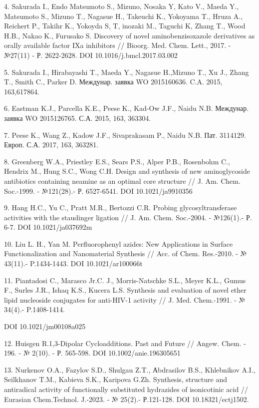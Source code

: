 4. Sakurada I., Endo Matsumoto S., Mizuno, Nosaka Y, Kato V., Maeda Y.,
Matsumoto S., Mizuno T., Nagasue H., Takeuchi K., Yokoyama T., Hruza A.,
Reichert P., Takihr K., Yokoyda S, T, inozaki M., Taguchi K, Zhang T.,
Wood H.B., Nakao K., Furusako S. Discovery of novel aminobenzisoxazole
derivatives as orally available factor IXa inhibitors // Bioorg. Med.
Chem. Lett., 2017. - №27(11) - Р. 2622-2628. DOI
10.1016/j.bmcl.2017.03.002

5. Sakurada I., Hirabayashi T., Maeda Y., Nagasue H.,Mizuno T., Xu J.,
Zhang T., Smith C., Parker D. Междунар. заявка WO 2015160636. C.A. 2015,
163,617864.

6. Eastman K.J., Parcella K.E., Peese K., Kad-Ow J.F., Naidu N.B.
Междунар. заявка WO 2015126765. С.А. 2015, 163, 363304.

7. Peese K., Wang Z., Kadow J.F., Sivaprakasam P., Naidu N.B. Пат.
3114129. Европ. С.А. 2017, 163, 363281.

8. Greenberg W.A., Priestley E.S., Sears P.S., Alper P.B., Rosenbohm C.,
Hendrix M., Hung S.C., Wong C.H. Design and synthesis of new
aminoglycoside antibiotics containing neamine as an optimal core
structure // J. Am. Chem. Soc.-1999. - №121(28).- Р. 6527-6541. DOI
10.1021/ja9910356

9. Hang H.C., Yu C., Pratt M.R., Bertozzi C.R. Probing
glycosyltransferase activities with the staudinger ligation // J. Am.
Chem. Soc.-2004. - №126(1).- Р. 6-7. DOI 10.1021/ja037692m

10. Liu L. H., Yan M. Perfluorophenyl azides: New Applications in
Surface Functionalization and Nanomaterial Synthesis // Acc. of Chem.
Res.-2010. - № 43(11).- P.1434-1443. DOI 10.1021/ar100066t

11. Piantadosi C., Marasco Jr.C. J., Morris-Natschke S.L., Meyer K.L.,
Gumus F., Surles J.R., Ishaq K.S., Kucera L.S. Synthesis and evaluation
of novel ether lipid nucleoside conjugates for anti-HIV-1 activity // J.
Med. Chem.-1991. - № 34(4).- P.1408-1414.

DOI 10.1021/jm00108a025

12. Huisgen R.1,3-Dipolar Cycloadditions. Past and Future // Angew.
Chem. - 196. - № 2(10). - Р. 565-598. DOI 10.1002/anie.196305651

13. Nurkenov O.A., Fazylov S.D., Shulgau Z.T., Аbdrasilov B.S.,
Khlebnikov A.I., Seilkhanov T.M., Kabieva S.K., Karipova G.Zh.
Synthesis, structure and antiradical activity of functionally
substituted hydrazides of isonicotinic acid // Eurasian Chem.Technol.
J.-2023. - № 25(2).- Р.121-128. DOI 10.18321/ectj1502.

